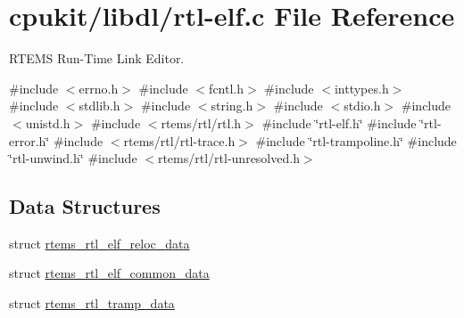 \hypertarget{rtl-elf_8c}{}\section{cpukit/libdl/rtl-\/elf.c File Reference}
\label{rtl-elf_8c}


R\+T\+E\+MS Run-\/\+Time Link Editor.  


{\ttfamily \#include $<$errno.\+h$>$}\newline
{\ttfamily \#include $<$fcntl.\+h$>$}\newline
{\ttfamily \#include $<$inttypes.\+h$>$}\newline
{\ttfamily \#include $<$stdlib.\+h$>$}\newline
{\ttfamily \#include $<$string.\+h$>$}\newline
{\ttfamily \#include $<$stdio.\+h$>$}\newline
{\ttfamily \#include $<$unistd.\+h$>$}\newline
{\ttfamily \#include $<$rtems/rtl/rtl.\+h$>$}\newline
{\ttfamily \#include \char`\"{}rtl-\/elf.\+h\char`\"{}}\newline
{\ttfamily \#include \char`\"{}rtl-\/error.\+h\char`\"{}}\newline
{\ttfamily \#include $<$rtems/rtl/rtl-\/trace.\+h$>$}\newline
{\ttfamily \#include \char`\"{}rtl-\/trampoline.\+h\char`\"{}}\newline
{\ttfamily \#include \char`\"{}rtl-\/unwind.\+h\char`\"{}}\newline
{\ttfamily \#include $<$rtems/rtl/rtl-\/unresolved.\+h$>$}\newline
\subsection*{Data Structures}
\begin{DoxyCompactItemize}
\item 
struct \mbox{\hyperlink{structrtems__rtl__elf__reloc__data}{rtems\+\_\+rtl\+\_\+elf\+\_\+reloc\+\_\+data}}
\item 
struct \mbox{\hyperlink{structrtems__rtl__elf__common__data}{rtems\+\_\+rtl\+\_\+elf\+\_\+common\+\_\+data}}
\item 
struct \mbox{\hyperlink{structrtems__rtl__tramp__data}{rtems\+\_\+rtl\+\_\+tramp\+\_\+data}}
\end{DoxyCompactItemize}
